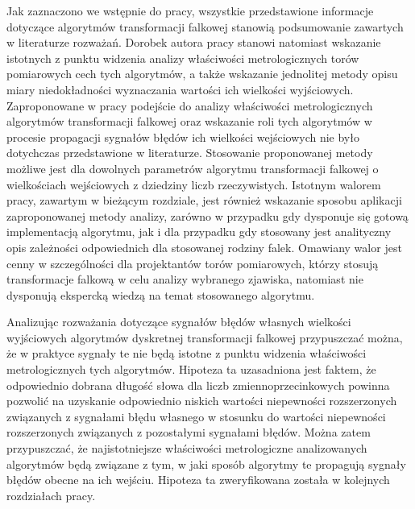 Jak zaznaczono we wstępnie do pracy, wszystkie przedstawione informacje dotyczące algorytmów transformacji falkowej stanowią podsumowanie zawartych w literaturze rozważań. Dorobek autora pracy stanowi natomiast wskazanie istotnych z punktu widzenia analizy właściwości metrologicznych torów pomiarowych cech tych algorytmów, a także wskazanie jednolitej metody opisu miary niedokładności wyznaczania wartości ich wielkości wyjściowych. Zaproponowane w pracy podejście do analizy właściwości metrologicznych algorytmów transformacji falkowej oraz wskazanie roli tych algorytmów w procesie propagacji sygnałów błędów ich wielkości wejściowych nie było dotychczas przedstawione w literaturze. Stosowanie proponowanej metody możliwe jest dla dowolnych parametrów algorytmu transformacji falkowej o wielkościach wejściowych z dziedziny liczb rzeczywistych. Istotnym walorem pracy, zawartym w bieżącym rozdziale, jest również wskazanie sposobu aplikacji zaproponowanej metody analizy, zarówno w przypadku gdy dysponuje się gotową implementacją algorytmu, jak i dla przypadku gdy stosowany jest analityczny opis zależności odpowiednich dla stosowanej rodziny falek. Omawiany walor jest cenny w szczególności dla projektantów torów pomiarowych, którzy stosują transformacje falkową w celu analizy wybranego zjawiska, natomiast nie dysponują ekspercką wiedzą na temat stosowanego algorytmu.

Analizując rozważania dotyczące sygnałów błędów własnych wielkości wyjściowych algorytmów dyskretnej transformacji falkowej przypuszczać można, że w praktyce sygnały te nie będą istotne z punktu widzenia właściwości metrologicznych tych algorytmów. Hipoteza ta uzasadniona jest faktem, że odpowiednio dobrana długość słowa dla liczb zmiennoprzecinkowych powinna pozwolić na uzyskanie odpowiednio niskich wartości niepewności rozszerzonych związanych z sygnałami błędu własnego w stosunku do wartości niepewności rozszerzonych związanych z pozostałymi sygnałami błędów. Można zatem przypuszczać, że najistotniejsze właściwości metrologiczne analizowanych algorytmów będą związane z tym, w jaki sposób algorytmy te propagują sygnały błędów obecne na ich wejściu. Hipoteza ta zweryfikowana została w kolejnych rozdziałach pracy.
